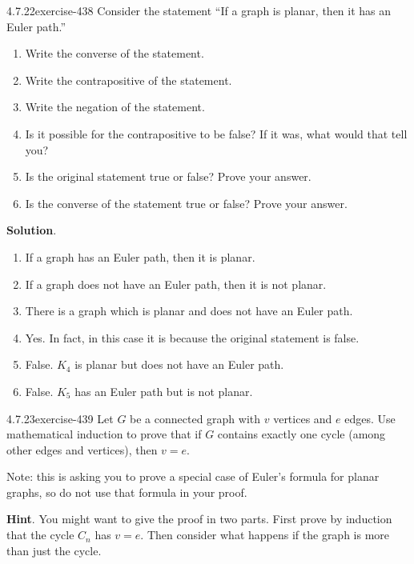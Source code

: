 \documentclass[twoside,11pt,]{book}
\numberwithin{equation}{chapter}
\begin{document}
\begin{divisionsolution}{4.7.22}{}{exercise-438}%
\hypertarget{p-5013}{}%
Consider the statement ``If a graph is planar, then it has an Euler path.''\leavevmode%
\begin{enumerate}[label=(\alph*)]
\item\hypertarget{li-2418}{}\hypertarget{p-5014}{}%
Write the converse of the statement.%
\item\hypertarget{li-2419}{}\hypertarget{p-5015}{}%
Write the contrapositive of the statement.%
\item\hypertarget{li-2420}{}\hypertarget{p-5016}{}%
Write the negation of the statement.%
\item\hypertarget{li-2421}{}\hypertarget{p-5017}{}%
Is it possible for the contrapositive to be false? If it was, what would that tell you?%
\item\hypertarget{li-2422}{}\hypertarget{p-5018}{}%
Is the original statement true or false? Prove your answer.%
\item\hypertarget{li-2423}{}\hypertarget{p-5019}{}%
Is the converse of the statement true or false? Prove your answer.%
\end{enumerate}
%
\par\smallskip%
\noindent\textbf{Solution}.\quad%
\hypertarget{p-5020}{}%
\leavevmode%
\begin{enumerate}[label=(\alph*)]
\item\hypertarget{li-2424}{}\hypertarget{p-5021}{}%
If a graph has an Euler path, then it is planar.%
\item\hypertarget{li-2425}{}\hypertarget{p-5022}{}%
If a graph does not have an Euler path, then it is not planar.%
\item\hypertarget{li-2426}{}\hypertarget{p-5023}{}%
There is a graph which is planar and does not have an Euler path.%
\item\hypertarget{li-2427}{}\hypertarget{p-5024}{}%
Yes. In fact, in this case it is because the original statement is false.%
\item\hypertarget{li-2428}{}\hypertarget{p-5025}{}%
False. \(K_4\) is planar but does not have an Euler path.%
\item\hypertarget{li-2429}{}\hypertarget{p-5026}{}%
False. \(K_5\) has an Euler path but is not planar.%
\end{enumerate}
%
\end{divisionsolution}%
\begin{divisionsolution}{4.7.23}{}{exercise-439}%
\hypertarget{p-5027}{}%
Let \(G\) be a connected graph with \(v\) vertices and \(e\) edges.  Use mathematical induction to prove that if \(G\) contains exactly one cycle (among other edges and vertices), then \(v = e\).%
\par
\hypertarget{p-5028}{}%
Note: this is asking you to prove a special case of Euler's formula for planar graphs, so do not use that formula in your proof.%
\par\smallskip%
\noindent\textbf{Hint}.\quad%
\hypertarget{p-5029}{}%
You might want to give the proof in two parts.  First prove by induction that the cycle \(C_n\) has \(v=e\).  Then consider what happens if the graph is more than just the cycle.%
\end{divisionsolution}%
\end{document}
